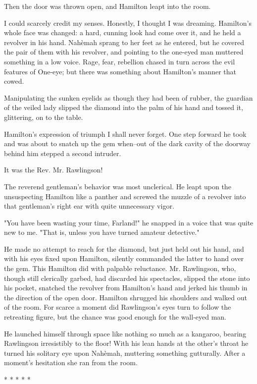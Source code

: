 Then the door was thrown open, and Hamilton leapt into the room.

I could scarcely credit my senses. Honestly, I thought I was dreaming.
Hamilton's whole face was changed: a hard, cunning look had come over
it, and he held a revolver in his hand. Nahèmah sprang to her feet as
he entered, but he covered the pair of them with his revolver, and
pointing to the one-eyed man muttered something in a low voice. Rage,
fear, rebellion chased in turn across the evil features of One-eye;
but there was something about Hamilton's manner that cowed.

Manipulating the sunken eyelids as though they had been of rubber,
the guardian of the veiled lady slipped the diamond into the palm
of his hand and tossed it, glittering, on to the table.

Hamilton's expression of triumph I shall never forget. One step
forward he took and was about to snatch up the gem when--out of the
dark cavity of the doorway behind him stepped a second intruder.

It was the Rev. Mr. Rawlingson!

The reverend gentleman's behavior was most unclerical. He leapt upon
the unsuspecting Hamilton like a panther and screwed the muzzle of a
revolver into that gentleman's right ear with quite unnecessary vigor.

"You have been wasting your time, Farland!" he snapped in a voice that
was quite new to me. "That is, unless you have turned amateur
detective."

He made no attempt to reach for the diamond, but just held out his
hand, and with his eyes fixed upon Hamilton, silently commanded the
latter to hand over the gem. This Hamilton did with palpable
reluctance. Mr. Rawlingson, who, though still clerically garbed, had
discarded his spectacles, slipped the stone into his pocket, snatched
the revolver from Hamilton's hand and jerked his thumb in the
direction of the open door. Hamilton shrugged his shoulders and walked
out of the room. For scarce a moment did Rawlingson's eyes turn to
follow the retreating figure, but the chance was good enough for the
wall-eyed man.

He launched himself through space like nothing so much as a kangaroo,
bearing Rawlingson irresistibly to the floor! With his lean hands at
the other's throat he turned his solitary eye upon Nahèmah, muttering
something gutturally. After a moment's hesitation she ran from the
room.

       *       *       *       *       *

